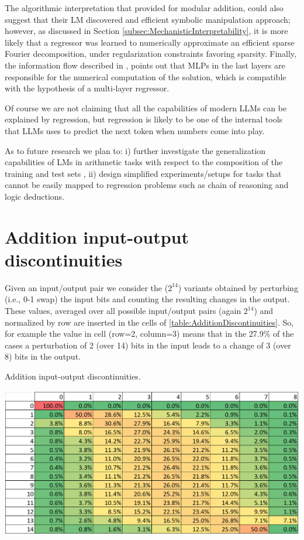 \documentclass[final,1p,times,authoryear]{elsarticle}
\begin{document}
The algorithmic interpretation that \citet{Nanda2023} provided for modular addition, could also suggest that their LM discovered and efficient symbolic manipulation approach; however, as discussed in Section \ref{subsec:MechanisticInterpretability}, it is more likely that a regressor was learned to numerically approximate an efficient sparse Fourier decomposition, under regularization constraints favoring sparsity. Finally, the information flow described in \citet{Stolfo2023}, points out that MLPs in the last layers are responsible for the numerical computation of the solution, which is compatible with the hypothesis of a multi-layer regressor.

Of course we are not claiming that all the capabilities of modern LLMs can be explained by regression, but regression is likely to be one of the internal tools that LLMs uses to predict the next token when numbers come into play. 

As to future research we plan to: i) further investigate the generalization capabilities of LMs in arithmetic tasks with respect to the composition of the training and test sets \citep{Feng2023,Keskar2017}, ii) design simplified experiments/setups for tasks that cannot be easily mapped to regression problems such as chain of reasoning and logic deductions.

\appendix

\section{Addition input-output discontinuities} \label{sec:AppendixA}

Given an input/output pair we consider the ($2^{14}$) variants obtained by perturbing (i.e., 0-1 swap) the input bits and counting the resulting changes in the output. These values, averaged over all possible input/output pairs (again $2^{14}$) and normalized by row are inserted in the cells of \ref{table:AdditionDiscontinuities}. So, for example the value in cell (row=2, column=3) means that in the 27.9\% of the cases a perturbation of 2 (over 14) bits in the input leads to a change of 3 (over 8) bits in the output.

\begin{table}[h!]
\caption{Addition input-output discontinuities.}
\label{table:AdditionDiscontinuities}
\includegraphics[width=\textwidth]{AdditionDiscontinuities}
\end{table}
\end{document}
